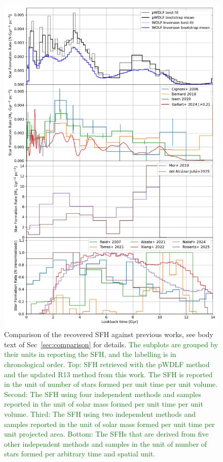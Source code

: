 \documentclass[fleqn,usenatbib]{mnras}
\begin{document}
\begin{figure}
  \includegraphics[width=\columnwidth]{figures/fig_10_compare_sfh.png}
  \caption{Comparison of the recovered SFH against previous works, see body
  text of Sec~\ref{sec:comparison} for details. \textcolor{green}{The subplots are 
  grouped by their units in reporting the SFH, and the labelling is in
  chronological order. Top: SFH retrieved with the
  pWDLF method and the updated R13 method from this work. The SFH is reported
  in the unit of number of stars formed per unit time per unit volume.
  Second: The SFH using four independent methods and samples reported in the
  unit of solar mass formed per unit time per unit volume. Third: The SFH using
  two independent methods and samples reported in the unit of solar mass formed
  per unit time per unit projected area. Bottom: The SFHs that are derived from
  five other independent methods and samples in the unit of number of stars formed
  per arbitrary time and spatial unit.}}
  \label{fig:comparison}
\end{figure}
\end{document}
